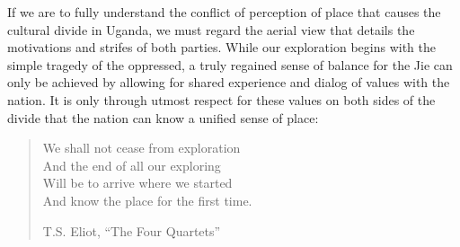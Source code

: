 \documentclass[12pt, letterpaper, oneside]{article}
\begin{document}
If we are to fully understand the conflict of perception of place that causes the cultural divide in Uganda, we must regard the aerial view that details the motivations and strifes of both parties. While our exploration begins with the simple tragedy of the oppressed, a truly regained sense of balance for the Jie can only be achieved by allowing for shared experience and dialog of values with the nation. It is only through utmost respect for these values on both sides of the divide that the nation can know a unified sense of place:
\begin{quote}
We shall not cease from exploration\\
And the end of all our exploring\\
Will be to arrive where we started\\
And know the place for the first time.

T.S. Eliot, ``The Four Quartets''
\end{quote}
\end{document}
